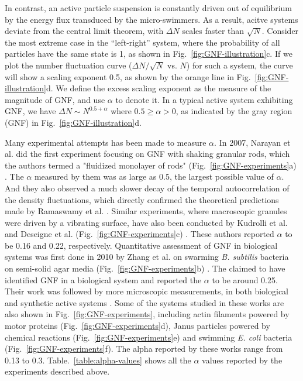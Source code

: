 In contrast, an active particle suspension is constantly driven out of equilibrium by the energy flux transduced by the micro-swimmers.
As a result, acitve systems deviate from the central limit theorem, with $\Delta N$ scales faster than $\sqrt N$.
Consider the most extreme case in the ``left-right'' system, where the probability of all particles have the same state is 1, as shown in Fig.~\ref{fig:GNF-illustration}c.
If we plot the number fluctuation curve ($\Delta N/\sqrt N$ vs. $N$) for such a system, the curve will show a scaling exponent 0.5, as shown by the orange line in Fig.~\ref{fig:GNF-illustration}d.
We define the excess scaling exponent as the measure of the magnitude of GNF, and use $\alpha$ to denote it.
In a typical active system exhibiting GNF, we have $\Delta N \sim N^{0.5+\alpha}$ where $0.5\ge\alpha>0$, as indicated by the gray region (GNF) in Fig.~\ref{fig:GNF-illustration}d.

Many experimental attempts has been made to measure $\alpha$. In 2007, Narayan et al. did the first experiment focusing on GNF with shaking granular rods, which the authors termed a "fluidized monolayer of rods" (Fig.~\ref{fig:GNF-experiments}a) \cite{Narayan2007}. The $\alpha$ measured by them was as large as 0.5, the largest possible value of $\alpha$. And they also observed a much slower decay of the temporal autocorrelation of the density fluctuations, which directly confirmed the theoretical predictions made by Ramaswamy et al. \cite{Ramaswamy2003}. Similar experiments, where macroscopic granules were driven by a vibrating surface, have also been conducted by Kudrolli et al. \cite{Kudrolli2008} and Deseigne et al. (Fig.~\ref{fig:GNF-experiments}c) \cite{Deseigne2010}. These authors reported $\alpha$ to be 0.16 and 0.22, respectively. Quantitative assessment of GNF in biological systems was first done in 2010 by Zhang et al. on swarming \textit{B. subtilis} bacteria on semi-solid agar media (Fig.~\ref{fig:GNF-experiments}b)  \cite{Zhang2010}.
The claimed to have identified GNF in a biological system and reported the $\alpha$ to be around 0.25. Their work was followed by more microscopic measurements, in both biological and synthetic active systems \cite{Schaller2013, Palacci2013, Kawaguchi2017, Nishiguchi2017, Karani2019}. Some of the systems studied in these works are also shown in Fig.~\ref{fig:GNF-experiments}, including actin filaments powered by motor proteins (Fig.~\ref{fig:GNF-experiments}d), Janus particles powered by chemical reactions (Fig.~\ref{fig:GNF-experiments}e) and swimming \textit{E. coli} bacteria (Fig.~\ref{fig:GNF-experiments}f). The alpha reported by these works range from 0.13 to 0.3.
Table.~\ref{table:alpha-values} shows all the $\alpha$ values reported by the experiments described above.


